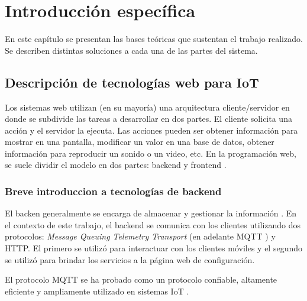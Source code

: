 \chapter{Introducción específica} %

\label{Chapter2}

En este capítulo se presentan las bases teóricas que sustentan el trabajo realizado. Se describen distintas soluciones a cada una de las partes del sistema.

\section{Descripción de tecnologías web para IoT}
\label{sec:Descripción de tecnologías web para IoT}


Los sistemas web utilizan (en su mayoría) una arquitectura cliente/servidor en donde se subdivide las tareas a desarrollar en dos partes. El cliente solicita una acción y el servidor la ejecuta. Las acciones pueden ser obtener información para mostrar en una pantalla, modificar un valor en una base de datos, obtener información para reproducir un sonido o un video, etc. En la programación web, se suele dividir el modelo en dos partes: backend y frontend .  

\subsection{ Breve introduccion a tecnologías de backend}
El backen  generalmente se encarga de almacenar y gestionar la información \citep{ARTICLE:4}. En el contexto de este trabajo, el backend se comunica con los clientes utilizando dos protocolos: \textit{Message Queuing Telemetry Transport} (en adelante MQTT )  y HTTP. El primero se utilizó para interactuar con los clientes móviles y el segundo se utilizó para brindar los servicios a la página web de configuración.

El protocolo MQTT \citep{ WEBSITE:5} se ha probado como un protocolo confiable, altamente eficiente y ampliamente utilizado en sistemas IoT \citep{ARTICLE:2}.

